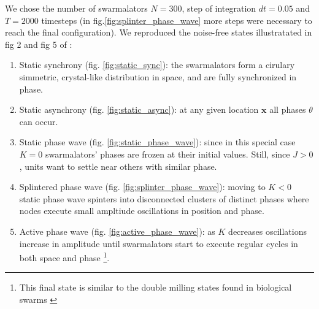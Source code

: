 We chose the number of swarmalators $N=300$, step of integration $dt=0.05$ and $T=2000$ timesteps (in fig.\ref{fig:splinter_phase_wave} more steps were necessary to reach the final configuration).
We reproduced the noise-free states illustratated in fig 2 and fig 5 of \cite{O_Keeffe_2017}:

\begin{enumerate}
    \item Static synchrony (fig. \ref{fig:static_sync}): the swarmalators form a cirulary simmetric, crystal-like distribution in space, and are fully synchronized in phase.
    \item Static asynchrony (fig. \ref{fig:static_async}): at any given location $\mathbf{x}$ all phases $\theta$ can occur.
    \item Static phase wave (fig. \ref{fig:static_phase_wave}): since in this special case $K=0$ swarmalators' phases are frozen at their initial values. Still, since $J >0$, units want to settle near others with similar phase.
    \item Splintered phase wave (fig. \ref{fig:splinter_phase_wave}): moving to $K<0$ static phase wave spinters into disconnected clusters of distinct phases where nodes execute small ampltiude oscillations in position and phase.
    \item Active phase wave (fig. \ref{fig:active_phase_wave}): as $K$ decreases oscillations increase in amplitude until swarmalators start to execute regular cycles in both space and phase \footnote{This final state is similar to the double milling states found in biological swarms \cite{Carrillo2009}}.
    
    \end{enumerate}



\newcommand{\imagewidth}{0.55\textwidth} %


